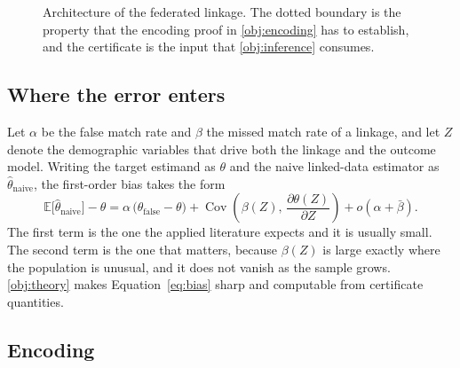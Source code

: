 \begin{figure}[htbp]
  \caption{Architecture of the \proj{} federated linkage. The dotted boundary is the property that
  the encoding proof in \ref{obj:encoding} has to establish, and the certificate is the input that
  \ref{obj:inference} consumes.}
  \label{fig:architecture}
\end{figure}

\subsection{Where the error enters}

Let $\alpha$ be the false match rate and $\beta$ the missed match rate of a linkage, and let $Z$
denote the demographic variables that drive both the linkage and the outcome model. Writing the
target estimand as $\theta$ and the naive linked-data estimator as $\hat{\theta}_{\text{naive}}$,
the first-order bias takes the form
\begin{equation}
  \label{eq:bias}
  \mathbb{E}\bigl[\hat{\theta}_{\text{naive}}\bigr] - \theta
    = \alpha\,\bigl(\theta_{\text{false}} - \theta\bigr)
    + \operatorname{Cov}\!\left(\beta(Z),\, \frac{\partial \theta(Z)}{\partial Z}\right) + o(\alpha + \bar{\beta}).
\end{equation}
The first term is the one the applied literature expects and it is usually small. The second term
is the one that matters, because $\beta(Z)$ is large exactly where the population is unusual, and
it does not vanish as the sample grows. \ref{obj:theory} makes Equation~\eqref{eq:bias} sharp and
computable from certificate quantities.

\subsection{Encoding}

